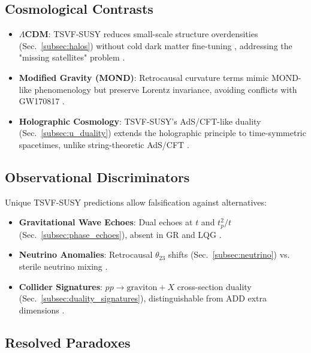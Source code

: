 \documentclass[twocolumn,superscriptaddress,floatfix]{revtex4-2}
\begin{document}
\subsection{Cosmological Contrasts}
\label{subsec:cosmo_comparison}

\begin{itemize}
\item \textbf{\(\Lambda\)CDM}: TSVF-SUSY reduces small-scale structure overdensities (Sec.~\ref{subsec:halos}) without cold dark matter fine-tuning \cite{Bullock2017}, addressing the "missing satellites" problem \cite{Klypin1999}.  
\item \textbf{Modified Gravity (MOND)}: Retrocausal curvature terms mimic MOND-like phenomenology \cite{McGaugh2016} but preserve Lorentz invariance, avoiding conflicts with GW170817 \cite{Ezquiaga2018}.  
\item \textbf{Holographic Cosmology}: TSVF-SUSY's AdS/CFT-like duality (Sec.~\ref{subsec:u_duality}) extends the holographic principle \cite{Bousso2002} to time-symmetric spacetimes, unlike string-theoretic AdS/CFT \cite{Maldacena1999}.  
\end{itemize}

\subsection{Observational Discriminators}
\label{subsec:discriminators}

Unique TSVF-SUSY predictions allow falsification against alternatives:
\begin{itemize}
\item \textbf{Gravitational Wave Echoes}: Dual echoes at \( t \) and \( t_p^2/t \) (Sec.~\ref{subsec:phase_echoes}), absent in GR and LQG \cite{Abedi2017}.  
\item \textbf{Neutrino Anomalies}: Retrocausal \( \theta_{23} \) shifts (Sec.~\ref{subsec:neutrino}) vs. sterile neutrino mixing \cite{Dentler2018}.  
\item \textbf{Collider Signatures}: \( pp \to \text{graviton} + X \) cross-section duality (Sec.~\ref{subsec:duality_signatures}), distinguishable from ADD extra dimensions \cite{ArkaniHamed1998}.  
\end{itemize}

\subsection{Resolved Paradoxes}
\label{subsec:paradoxes}
\end{document}
